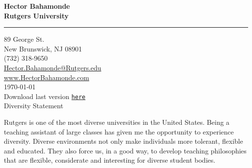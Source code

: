 \documentclass[11pt]{letter} %
\date{}
\begin{document}

\begin{letter}{} 


\begin{center}
\large\bf Hector Bahamonde \\ %
Rutgers University\\
\vspace{20pt} \hrule height 1pt %
89 George St. \\ New Brunswick, NJ 08901 \\ (732) 318-9650 \\ 
{\normalfont\normalsize\href{mailto:hector.bahamonde@rutgers.edu}{Hector.Bahamonde@Rutgers.edu}} \\
{\normalfont\normalsize\href{http://www.hectorbahamonde.com}{www.HectorBahamonde.com}}\\
{\normalfont \scriptsize{
\vspace{5mm}\today\\
Download last version \href{http://github.com/hbahamonde/Job_Market/raw/master/Bahamonde_Diversity_Statement.pdf}{\texttt{{\color{red}here}}}}} %
\\
{\huge\vspace{6mm} Diversity Statement}
\end{center} 


\opening{} 
\vspace{-1.5cm}
Rutgers is one of the most diverse universities in the United States. Being a teaching assistant of large classes has given me the opportunity to experience diversity. Diverse environments not only make individuals more tolerant, flexible and educated. They also force us, in a good way, to develop teaching philosophies that are flexible, considerate and interesting for diverse student bodies. 


\end{letter}
\end{document}
